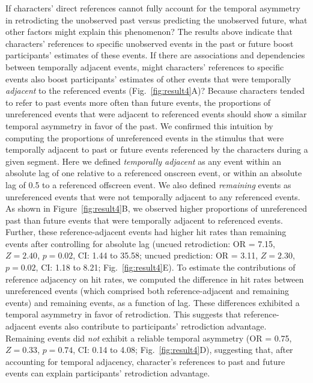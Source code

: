 \documentclass[10pt]{article}
\begin{document}
If characters' direct references cannot fully account for the temporal asymmetry in retrodicting the unobserved past versus predicting the unobserved future, what other factors might explain this phenomenon?  The results above indicate that characters’ references to specific unobserved events in the past or future boost participants’ estimates of these events.  If there are associations and dependencies between temporally adjacent events, might characters’ references to specific events also boost participants’ estimates of other events that were temporally \textit{adjacent} to the referenced events (Fig.~\ref{fig:result4}A)?  Because characters tended to refer to past events more often than future events, the proportions of unreferenced events that were adjacent to referenced events should show a similar temporal asymmetry in favor of the past.  We confirmed this intuition by computing the proportions of unreferenced events in the stimulus that were temporally adjacent to past or future events referenced by the characters during a given segment.  Here we defined \textit{temporally adjacent} as any event within an absolute lag of one relative to a referenced onscreen event, or within an absolute lag of 0.5 to a referenced offscreen event.  We also defined \textit{remaining} events as unreferenced events that were not temporally adjacent to any referenced events.  As shown in Figure~\ref{fig:result4}B, we observed higher proportions of unreferenced past than future events that were temporally adjacent to referenced events.  Further, these reference-adjacent events had higher hit rates than remaining events after controlling for absolute lag (uncued retrodiction: OR = 7.15, $Z = 2.40$, $p = 0.02$, CI: 1.44 to 35.58; uncued prediction: OR = 3.11, $Z = 2.30$, $p = 0.02$, CI: 1.18 to 8.21; Fig.~\ref{fig:result4}E).  To estimate the contributions of reference adjacency on hit rates, we computed the difference in hit rates between unreferenced events (which comprised both reference-adjacent and remaining events) and remaining events, as a function of lag.  These differences exhibited a temporal asymmetry in favor of retrodiction.  This suggests that reference-adjacent events also contribute to participants' retrodiction advantage.  Remaining events did \textit{not} exhibit a reliable temporal asymmetry (OR = 0.75, $Z = 0.33$, $p = 0.74$, CI: 0.14 to 4.08; Fig.~\ref{fig:result4}D), suggesting that, after accounting for temporal adjacency, character's references to past and future events can explain participants' retrodiction advantage.
\end{document}
